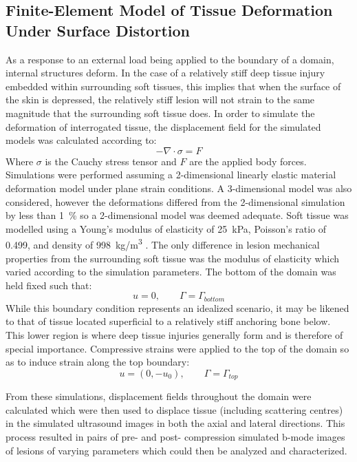 		\subsection{Finite-Element Model of Tissue Deformation Under Surface Distortion}
			As a response to an external load being applied to the boundary of a domain, internal structures deform. In the case of a relatively stiff deep tissue injury embedded within surrounding soft tissues, this implies that when the surface of the skin is depressed, the relatively stiff lesion will not strain to the same magnitude that the surrounding soft tissue does. In order to simulate the deformation of interrogated tissue, the displacement field for the simulated models was calculated according to:
			\begin{equation}
				- {\nabla} \cdot \sigma = {F}
			\end{equation}
			Where $\sigma$ is the Cauchy stress tensor and $F$ are the applied body forces. Simulations were performed assuming a 2-dimensional linearly elastic material deformation model under plane strain conditions. A 3-dimensional model was also considered, however the deformations differed from the 2-dimensional simulation by less than \SI{1}{\percent} so a 2-dimensional model was deemed adequate. Soft tissue was modelled using a Young's modulus of elasticity of \SI{25}{kPa}, Poisson's ratio of 0.499, and density of \SI{998}{kg/m^3} \cite{krouskop98, choi05, martin94}. The only difference in lesion mechanical properties from the surrounding soft tissue was the modulus of elasticity which varied according to the simulation parameters. The bottom of the domain was held fixed such that:
			\begin{equation}
				{u} = 0, \qquad \Gamma = \Gamma_{bottom}
			\end{equation}
			While this boundary condition represents an idealized scenario, it may be likened to that of tissue located superficial to a relatively stiff anchoring bone below. This lower region is where deep tissue injuries generally form and is therefore of special importance. Compressive strains were applied to the top of the domain so as to induce strain along the top boundary:
			\begin{equation}
				{u} = (0, -u_0), \qquad \Gamma = \Gamma_{top}
			\end{equation}

			From these simulations, displacement fields throughout the domain were calculated which were then used to displace tissue (including scattering centres) in the simulated ultrasound images in both the axial and lateral directions. This process resulted in pairs of pre- and post- compression simulated b-mode images of lesions of varying parameters which could then be analyzed and characterized.

